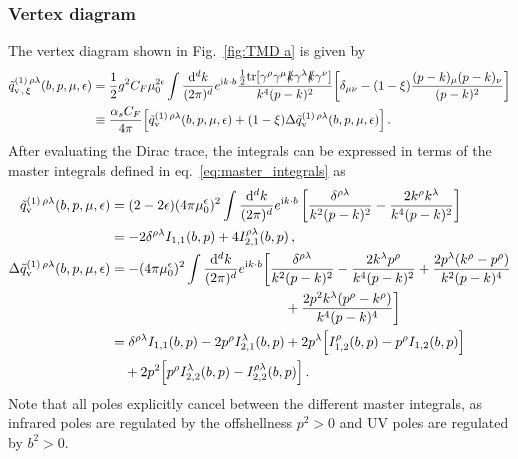 \documentclass[11pt,a4paper]{article}
\DeclareRobustCommand{\eq}[1]{eq.~\eqref{eq:#1}}
\DeclareRobustCommand{\fig}[1]{Fig.~\ref{fig:#1}}
\newcommand{\df}{\mathrm{d}}
\newcommand{\img}{\mathrm{i}}
\newcommand{\eps}{\epsilon}
\newcommand{\nn}{\nonumber}
\newcommand{\as}{\alpha_s}
\newcommand{\tr}{\mathrm{tr}}
\begin{document}
\subsubsection{Vertex diagram}
\label{sec:vertex_diagram}

The vertex diagram shown in \fig{TMD a} is given by
\begin{align} \label{eq:vertex_1}
 \tilde q^{(1)\,\rho\lambda}_{{\rm v}\,,\,\xi}(b,p,\mu,\eps) &
 = \frac12 g^2 C_F \mu_0^{2\eps} \int\frac{\df^d k}{(2\pi)^d} e^{\img k \cdot b}
   \frac{\frac12 \tr[\gamma^\rho  \gamma^\mu \slashed{k} \gamma^\lambda \slashed{k} \gamma^\nu]}{k^4 (p-k)^2} \biggl[ \delta_{\mu\nu} - (1-\xi) \frac{(p-k)_\mu (p-k)_\nu}{(p-k)^2} \biggr]
\nn\\&
 \equiv \frac{\as C_F}{4\pi} \Bigl[ \tilde q^{(1)\,\rho\lambda}_{\rm v}(b,p,\mu,\eps) + (1-\xi) \Delta \tilde q^{(1)\,\rho\lambda}_{\rm v}(b,p,\mu,\eps) \Bigr]
\,.\end{align}
After evaluating the Dirac trace, the integrals can be expressed in terms of the master integrals
defined in \eq{master_integrals} as
\begin{align} \label{eq:vertex_final}
 \tilde q^{(1)\,\rho\lambda}_{\rm v}(b,p,\mu,\eps) &
 = (2-2\eps) (4\pi \mu_0^\eps)^2 \int\frac{\df^d k}{(2\pi)^d} e^{\img k \cdot b}
   \left[ \frac{\delta^{\rho\lambda}}{k^2 (p-k)^2} - \frac{2 k^\rho k^\lambda}{k^4 (p-k)^2} \right]
 \\\nn&
 = -2 \delta^{\rho\lambda} I_{1,1}(b,p) + 4 I_{2,1}^{\rho\lambda}(b,p) 
\,,\\ \label{eq:vertex_cov_final}
 \Delta \tilde q^{(1)\,\rho\lambda}_{\rm v}(b,p,\mu,\eps) &
 = - (4\pi \mu_0^\eps)^2 \int\frac{\df^d k}{(2\pi)^d} e^{\img k \cdot b}
   \biggl[
      \frac{\delta^{\rho\lambda}}{k^2 (p-k)^2}
    - \frac{2 k^\lambda p^\rho}{k^4 (p-k)^2}
    + \frac{2 p^\lambda (k^\rho-p^\rho)}{k^2 (p-k)^4}
    \nn \\\nn&\hspace{4.5cm}
    + \frac{2 p^2 k^\lambda (p^\rho-k^\rho)}{k^4 (p-k)^4}
   \biggr]
 \\\nn&
 = \delta^{\rho\lambda} I_{1,1}(b,p) - 2 p^\rho I_{2,1}^\lambda(b,p)
   + 2 p^\lambda \Bigl[ I_{1,2}^\rho(b,p) - p^\rho I_{1,2}(b,p) \Bigr]
   \nn\\&\quad
   + 2 p^2 \Bigl[ p^\rho I^\lambda_{2,2}(b,p) -I_{2,2}^{\rho\lambda}(b,p) \Bigr] 
\,.\end{align}
Note that all poles explicitly cancel between the different master integrals,
as infrared poles are regulated by the offshellness $p^2>0$ and UV poles are regulated by $b^2>0$.
\end{document}

